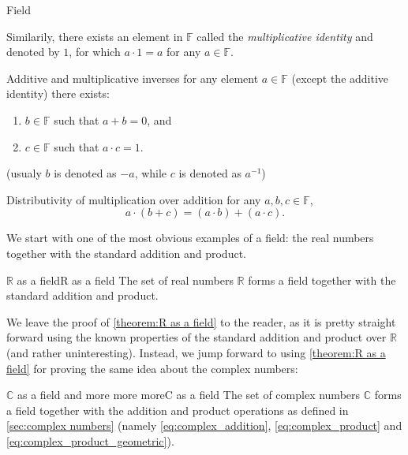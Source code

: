 \begin{definition}{Field}{}
\begin{descitemize}
			Similarily, there exists an element in $\mathbb{F}$ called the \textit{multiplicative identity} and denoted by $1$, for which $a\cdot1=a$ for any $a\in\mathbb{F}$.

		\item[Additive and multiplicative inverses] for any element $a\in\mathbb{F}$ (except the additive identity) there exists:
			\begin{enumerate}
				\item $b\in\mathbb{F}$ such that $a+b=0$, and
				\item $c\in\mathbb{F}$ such that $a\cdot c=1$.
			\end{enumerate}
			(usualy $b$ is denoted as $-a$, while $c$ is denoted as $a^{-1}$)

		\item[Distributivity of multiplication over addition] for any $a,b,c\in\mathbb{F}$,
			\[
				a\cdot(b+c) = (a\cdot b) + (a\cdot c).
			\]
	\end{descitemize}
\end{definition}

We start with one of the most obvious examples of a field: the real numbers together with the standard addition and product.

\begin{theorem}{$\bm{\mathbb{R}}$ as a field}{R as a field}
	The set of real numbers $\mathbb{R}$ forms a field together with the standard addition and product.
\end{theorem}

We leave the proof of \autoref{theorem:R as a field} to the reader, as it is pretty straight forward using the known properties of the standard addition and product over $\mathbb{R}$ (and rather uninteresting). Instead, we jump forward to using \autoref{theorem:R as a field} for proving the same idea about the complex numbers:

\begin{theorem}{$\bm{\mathbb{C}}$ as a field and more more more}{C as a field}
	The set of complex numbers $\mathbb{C}$ forms a field together with the addition and product operations as defined in \autoref{sec:complex numbers} (namely \autoref{eq:complex_addition}, \autoref{eq:complex_product} and \autoref{eq:complex_product_geometric}).
\end{theorem}

